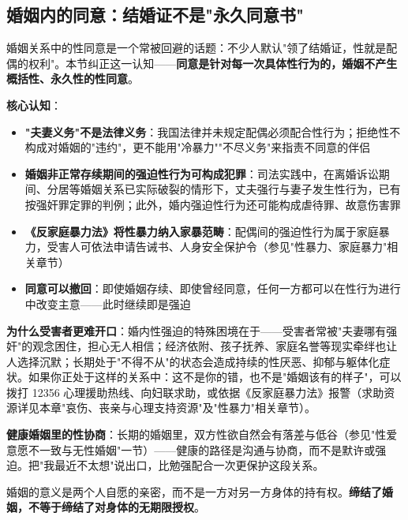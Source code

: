 \subsection{婚姻内的同意：结婚证不是"永久同意书"}

婚姻关系中的性同意是一个常被回避的话题：不少人默认"领了结婚证，性就是配偶的权利"。本节纠正这一认知——\textbf{同意是针对每一次具体性行为的，婚姻不产生概括性、永久性的性同意}。

\vspace{0.5em}
\noindent\textbf{核心认知}：

\begin{itemize}
	\item \textbf{"夫妻义务"不是法律义务}：我国法律并未规定配偶必须配合性行为；拒绝性不构成对婚姻的"违约"，更不能用"冷暴力""不尽义务"来指责不同意的伴侣
	\item \textbf{婚姻非正常存续期间的强迫性行为可构成犯罪}：司法实践中，在离婚诉讼期间、分居等婚姻关系已实际破裂的情形下，丈夫强行与妻子发生性行为，已有按强奸罪定罪的判例；此外，婚内强迫性行为还可能构成虐待罪、故意伤害罪
	\item \textbf{《反家庭暴力法》将性暴力纳入家暴范畴}：配偶间的强迫性行为属于家庭暴力，受害人可依法申请告诫书、人身安全保护令（参见"性暴力、家庭暴力"相关章节）
	\item \textbf{同意可以撤回}：即使婚姻存续、即使曾经同意，任何一方都可以在性行为进行中改变主意——此时继续即是强迫
\end{itemize}

\vspace{0.5em}
\noindent\textbf{为什么受害者更难开口}：婚内性强迫的特殊困境在于——受害者常被"夫妻哪有强奸"的观念困住，担心无人相信；经济依附、孩子抚养、家庭名誉等现实牵绊也让人选择沉默；长期处于"不得不从"的状态会造成持续的性厌恶、抑郁与躯体化症状。如果你正处于这样的关系中：这不是你的错，也不是"婚姻该有的样子"，可以拨打 12356 心理援助热线、向妇联求助，或依据《反家庭暴力法》报警（求助资源详见本章"哀伤、丧亲与心理支持资源"及"性暴力"相关章节）。

\vspace{0.5em}
\noindent\textbf{健康婚姻里的性协商}：长期的婚姻里，双方性欲自然会有落差与低谷（参见"性爱意愿不一致与无性婚姻"一节）——健康的路径是沟通与协商，而不是默许或强迫。把"我最近不太想"说出口，比勉强配合一次更保护这段关系。

\begin{tcolorbox}[colback=pink!5!white,colframe=red!50!black,title=贴心小叮咛]
婚姻的意义是两个人自愿的亲密，而不是一方对另一方身体的持有权。\textbf{缔结了婚姻，不等于缔结了对身体的无期限授权}。
\end{tcolorbox}
